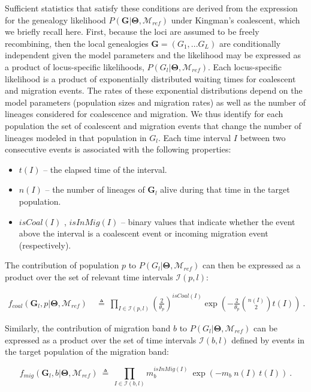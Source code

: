 \documentclass[11pt]{article}
\newcommand{\vect}[1]{\boldsymbol{\mathbf{#1}}}
\newcommand{\M}{\mathcal{M}}
\newcommand{\G}{\vect{G}}
\newcommand{\T}{\vect{\Theta}}
\newcommand{\Ip}{\mathcal{I}(p,l)}
\newcommand{\Ib}{\mathcal{I}(b,l)}
\newcommand{\Mref}{\M_{ref}}
\newcommand{\1}{\mathbbm{1}}
\begin{document}
Sufficient statistics that satisfy these conditions are derived from the expression for the genealogy likelihood $P(\G|\T, \Mref)$ under Kingman's coalescent, which we briefly recall here.
First, because the loci are assumed to be freely recombining, then the local genealogies $\G=(G_1,...G_L)$ are conditionally independent given the model parameters and the likelihood may be expressed as a product of locus-specific likelihoods, $P(G_l|\T,\Mref)$.  Each locus-specific likelihood is a product of exponentially distributed waiting times for coalescent and migration events. The rates of these exponential distributions depend on the model parameters (population sizes and migration rates) as well as the number of lineages considered for coalescence and migration. We thus identify for each population the set of coalescent and migration events that change the number of lineages modeled in that population in $G_l$. Each time interval $I$ between two consecutive events is associated with the following properties:
\begin{itemize}
 \item $t(I)$ -- the elapsed time of the interval.
 \item $n(I)$ -- the number of lineages of $\G_l$ alive during that time in the target population.
 \item $isCoal(I)$ , $isInMig(I)$  -- binary values that indicate whether the event above the interval is a coalescent event or incoming migration event (respectively).
\end{itemize}
%
%
The contribution of population $p$ to $P(G_l|\T,\Mref)$ can then be expressed as a product over the set of relevant time intervals $\Ip$:
%
%
\begin{small}
\begin{align}
f_{coal}(\G_l,p|\T,\Mref) 
& ~\triangleq~ \prod_{I \in \Ip} \left(\frac{2}{\theta_p}\right)^{isCoal(I)} \exp\left(-\frac{2}{\theta_p}{n(I) \choose 2}t(I)\right) ~. %
\label{eqn:ld-coal}
\end{align}
\end{small}
%
%
Similarly, the contribution of migration band $b$ to $P(G_l|\T,\Mref)$ can be expressed as a product over the set of time intervals $\Ib$ defined by events in the target population of the migration band:
%
%
\begin{small}
\begin{equation}
f_{mig}(\G_l,b|\T,\Mref) ~\triangleq~ \prod_{I \in \Ib} m_{b}^{isInMig(I)} ~ \exp \left( - m_b~ n(I)~t(I)\right) ~.
\label{eqn:ld-mig}
\end{equation}
\end{small}
%
%
\end{document}
